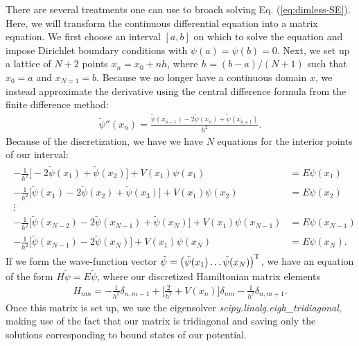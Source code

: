 There are several treatments one can use to broach solving Eq. (\ref{eq:dimless-SE}).
Here, we will transform the continuous differential equation into a matrix equation.
We first choose an interval $[a,b]$ on which to solve the equation and impose Dirichlet boundary conditions with $\psi(a) = \psi(b) = 0$.
Next, we set up a lattice of $N + 2$ points $x_{n} = x_0 + n h$, where $h = (b - a)/(N+1)$ such that $x_0 = a$ and $x_{N=1} = b$.
Because we no longer have a continuous domain $x$, we instead approximate the derivative using the central difference formula from the finite difference method:
\begin{align}
    \tilde{\psi}''(x_{n}) = \frac{\tilde{\psi}(x_{n-1}) - 2 \tilde{\psi}(x_{n}) + \tilde{\psi}(x_{n+1})}{h^2}
.\end{align}
Because of the discretization, we have we have $N$ equations for the interior points of our interval:
\begin{align}
\begin{aligned}
    -\frac{1}{h^2} \Big[ -2 \tilde{\psi}(x_1) + \tilde{\psi}(x_2) \Big] + V(x_{1}) \psi(x_1) &= E \psi(x_1) \\
    -\frac{1}{h^2} \Big[ \tilde{\psi}(x_1) - 2 \tilde{\psi}(x_2) + \tilde{\psi}(x_3) \Big] + V(x_{1}) \psi(x_2) &= E \psi(x_2) \\
    \vdots \\
    -\frac{1}{h^2} \Big[ \tilde{\psi}(x_{N-2}) - 2 \tilde{\psi}(x_{N-1}) + \tilde{\psi}(x_{N}) \Big] + V(x_{1}) \psi(x_{N-1}) &= E \psi(x_{N-1}) \\
    -\frac{1}{h^2} \Big[ \tilde{\psi}(x_{N-1}) - 2 \tilde{\psi}(x_{N}) \Big] + V(x_{1}) \psi(x_{N}) &= E \psi(x_{N})
.\end{aligned}
\end{align}
If we form the wave-function vector $\tilde{\psi} = \begin{pmatrix} \tilde{\psi}(x_{1}) \hdots \tilde{\psi}(x_{N}) \end{pmatrix}^{\rm T}$, we have an equation of the form $H \tilde{\psi} = E \tilde{\psi}$, where our discretized Hamiltonian matrix elements
\begin{align}
    H_{nm} = -\frac{1}{h^2} \delta_{n,m-1} + \Big[ \frac{2}{h^2} + V(x_{n}) \Big] \delta_{nm} - \frac{1}{h^2} \delta_{n,m+1}
.\end{align}
Once this matrix is set up, we use the eigensolver \textit{scipy.linalg.eigh\_tridiagonal}, making use of the fact that our matrix is tridiagonal and saving only the solutions corresponding to bound states of our potential.



